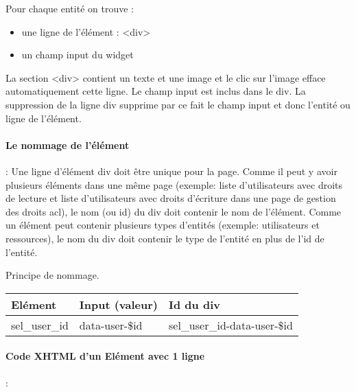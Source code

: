 Pour chaque entité on trouve :\\
\begin{itemize}
\item une ligne de l'élément : <div>
\item un champ input du widget
\end{itemize}
\vspace{0.3cm}

La section <div> contient un texte et une image et le clic sur l'image efface automatiquement cette ligne.
Le champ input est inclus dans le div. La suppression de la ligne div supprime par ce fait le champ input et donc l'entité ou ligne de l'élément.

\paragraph{Le nommage de l'élément} : Une ligne d'élément div doit être unique pour la page.
Comme il peut y avoir plusieurs éléments dans une même page (exemple: liste d'utilisateurs avec droits de lecture et liste d'utilisateurs avec droits d'écriture dans une page de gestion des droits acl), le nom (ou id) du div doit contenir le nom de l'élément.
Comme un élément peut contenir plusieurs types d'entités (exemple: utilisateurs et ressources), le nom du div doit contenir le type de l'entité en plus de l'id de l'entité.

Principe de nommage.\\

\begin{tabular}{|p{3cm}|p{4cm}|p{4cm}|}
\hline
\textbf{Elément} & \textbf{Input (valeur)} & \textbf{Id du div} \\
\hline
sel\_user\_id & data-user-\$id & sel\_user\_id-data-user-\$id \\
\hline
\end{tabular}


\paragraph{Code XHTML d'un Elément avec 1 ligne} :\\



